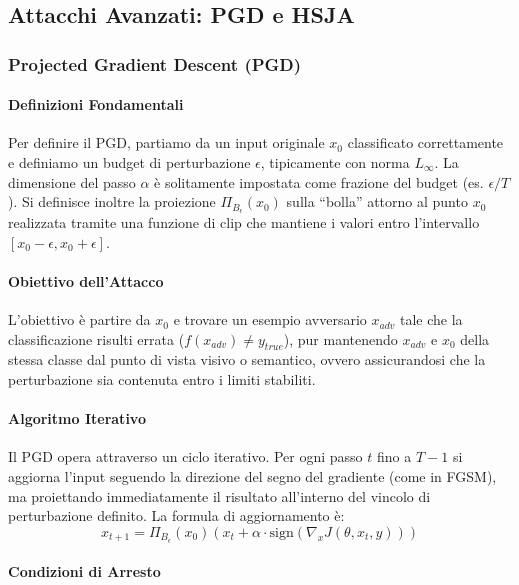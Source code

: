 \subsection{Attacchi Avanzati: PGD e HSJA}

\subsubsection{Projected Gradient Descent (PGD)}

\paragraph{Definizioni Fondamentali}

Per definire il PGD, partiamo da un input originale $x_0$
classificato correttamente e definiamo un budget di perturbazione
$\epsilon$, tipicamente con norma $L_\infty$. La dimensione del
passo $\alpha$ è solitamente impostata come frazione del budget
(es. $\epsilon/T$). Si definisce inoltre la proiezione
$\Pi_{B_{\epsilon}}(x_0)$ sulla ``bolla'' attorno al punto $x_0$
realizzata tramite una funzione di clip che mantiene i valori
entro l'intervallo $[x_0 - \epsilon, x_0 + \epsilon]$.

\paragraph{Obiettivo dell'Attacco}

L'obiettivo è partire da $x_0$ e trovare un esempio avversario
$x_{adv}$ tale che la classificazione risulti errata
($f(x_{adv}) \neq y_{true}$), pur mantenendo $x_{adv}$ e $x_0$
della stessa classe dal punto di vista visivo o semantico, ovvero
assicurandosi che la perturbazione sia contenuta entro i limiti
stabiliti.

\paragraph{Algoritmo Iterativo}

Il PGD opera attraverso un ciclo iterativo. Per ogni passo $t$
fino a $T-1$ si aggiorna l'input seguendo la direzione del segno
del gradiente (come in FGSM), ma proiettando immediatamente il
risultato all'interno del vincolo di perturbazione definito.
La formula di aggiornamento è:
\[
    x_{t+1} = \Pi_{B_{\epsilon}}(x_0)
    \left( x_t + \alpha \cdot
    \text{sign}(\nabla_x J(\theta, x_t, y)) \right)
\]

\paragraph{Condizioni di Arresto}

